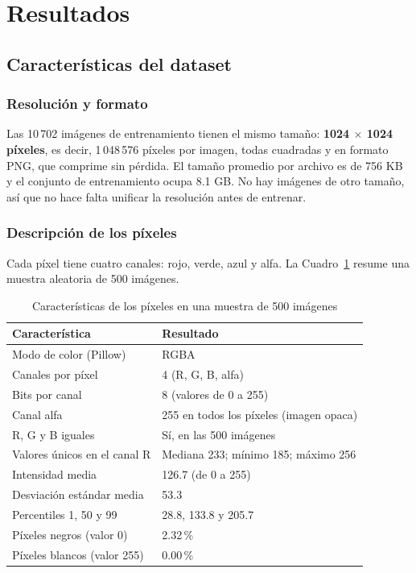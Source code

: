 \documentclass[a4paper,11pt]{article}
\begin{document}
  \section{Resultados}
  \subsection{Características del dataset}
  \subsubsection*{Resolución y formato}
  Las 10\,702 imágenes de entrenamiento tienen el mismo tamaño: \textbf{1024
  $\times$ 1024 píxeles}, es decir, 1\,048\,576 píxeles por imagen, todas
  cuadradas y en formato PNG, que comprime sin pérdida. El tamaño promedio por
  archivo es de 756 KB y el conjunto de entrenamiento ocupa 8.1 GB. No hay
  imágenes de otro tamaño, así que no hace falta unificar la resolución antes de
  entrenar.

  \subsubsection*{Descripción de los píxeles}
  Cada píxel tiene cuatro canales: rojo, verde, azul y alfa. La Cuadro~\ref{tab:pixeles}
  resume una muestra aleatoria de 500 imágenes.

  \begin{table}[H]
    \centering
    \caption{Características de los píxeles en una muestra de 500 imágenes}
    \label{tab:pixeles}
    \begin{tabular}{ll}
      \toprule
      Característica & Resultado \\
      \midrule
      Modo de color (Pillow) & RGBA \\
      Canales por píxel & 4 (R, G, B, alfa) \\
      Bits por canal & 8 (valores de 0 a 255) \\
      Canal alfa & 255 en todos los píxeles (imagen opaca) \\
      R, G y B iguales & Sí, en las 500 imágenes \\
      Valores únicos en el canal R & Mediana 233; mínimo 185; máximo 256 \\
      Intensidad media & 126.7 (de 0 a 255) \\
      Desviación estándar media & 53.3 \\
      Percentiles 1, 50 y 99 & 28.8, 133.8 y 205.7 \\
      Píxeles negros (valor 0) & 2.32\,\% \\
      Píxeles blancos (valor 255) & 0.00\,\% \\
      \bottomrule
    \end{tabular}
  \end{table}
\end{document}
